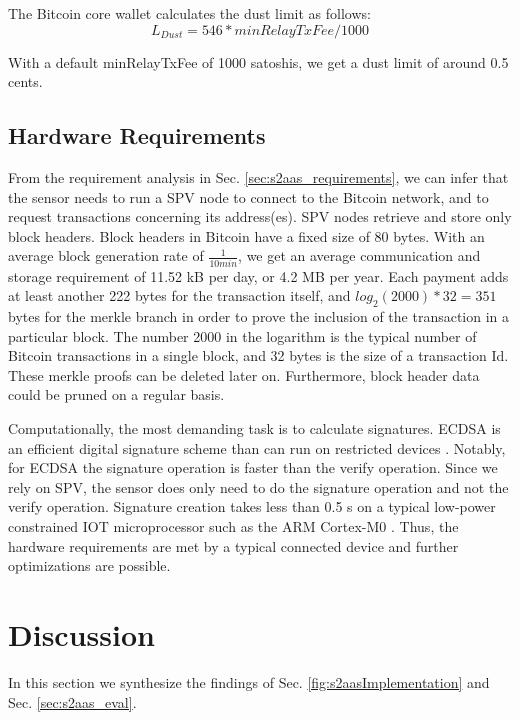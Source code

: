 The Bitcoin core wallet calculates the dust limit as follows:
\begin{equation*}
L_{Dust} = 546*minRelayTxFee/1000
\end{equation*}

With a default minRelayTxFee of 1000 satoshis, we get a dust limit of around 0.5 cents.

\subsection{Hardware Requirements}

From the requirement analysis in Sec. \ref{sec:s2aas_requirements}, we can infer that the sensor needs to run a \ac{SPV} node to connect to the Bitcoin network, and to request transactions concerning its address(es). \ac{SPV} nodes retrieve and store only block headers. Block headers in Bitcoin have a fixed size of 80 bytes. With an average block generation rate of $\frac{1}{10 min}$, we get an average communication and storage requirement of 11.52 kB per day, or 4.2 MB per year. Each payment adds at least another 222 bytes for the transaction itself, and $log_2(2000)*32=351$ bytes for the merkle branch in order to prove the inclusion of the transaction in a particular block. The number 2000 in the logarithm is the typical number of Bitcoin transactions in a single block, and 32 bytes is the size of a transaction Id. These merkle proofs can be deleted later on. Furthermore, block header data could be pruned on a regular basis.

Computationally, the most demanding task is to calculate signatures. \ac{ECDSA} is an efficient digital signature scheme than can run on restricted devices \parencite{fi3010031}. Notably, for \ac{ECDSA} the signature operation is faster than the verify operation. Since we rely on \ac{SPV}, the sensor does only need to do the signature operation and not the verify operation. Signature creation takes less than 0.5 s on a typical low-power constrained \ac{IOT} microprocessor such as the ARM Cortex-M0 \parencite{ecdsaarm}. Thus, the hardware requirements are met by a typical connected device and further optimizations are possible.

\section{Discussion}
\label{sec:s2aas_findings}

In this section we synthesize the findings of Sec. \ref{fig:s2aasImplementation} and Sec. \ref{sec:s2aas_eval}.

